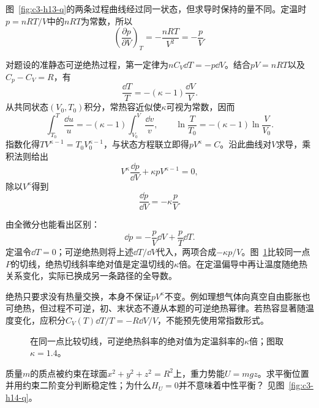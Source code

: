 \begin{solution}
图~\ref{fig:c3-h13-q}的两条过程曲线经过同一状态，但求导时保持的量不同。定温时$p=nRT/V$中的$nRT$为常数，所以
\[\boxed{\left(\frac{\partial p}{\partial V}\right)_T=-\frac{nRT}{V^2}=-\frac pV}.\]

对题设的准静态可逆绝热过程，第一定律为$nC_V\dd T=-p\dd V$。结合$pV=nRT$以及$C_p-C_V=R$，有
\[\frac{\dd T}{T}=-(\kappa-1)\frac{\dd V}{V}.
\]
从共同状态$(V_0,T_0)$积分，常热容近似使$\kappa$可视为常数，因而
\[
\int_{T_0}^{T}\frac{\dd u}{u}
=-(\kappa-1)\int_{V_0}^{V}\frac{\dd v}{v},\qquad
\ln\frac{T}{T_0}=-(\kappa-1)\ln\frac{V}{V_0}.
\]
指数化得$TV^{\kappa-1}=T_0V_0^{\kappa-1}$，与状态方程联立即得$pV^\kappa=C$。沿此曲线对$V$求导，乘积法则给出
\[V^\kappa\frac{\dd p}{\dd V}+\kappa pV^{\kappa-1}=0,\]
除以$V^\kappa$得到
\[\boxed{\frac{\dd p}{\dd V}=-\kappa\frac pV}.\]

由全微分也能看出区别：
\[\dd p=-\frac pV\dd V+\frac pT\dd T.\]
定温令$\dd T=0$；可逆绝热则将上述$\dd T/\dd V$代入，两项合成$-\kappa p/V$。图~\ref{fig:c3-h13-s}比较同一点$P$的切线，绝热切线斜率绝对值是定温切线的$\kappa$倍。在定温偏导中再让温度随绝热关系变化，实际已换成另一条路径的全导数。

绝热只要求没有热量交换，本身不保证$pV^\kappa$不变。例如理想气体向真空自由膨胀也可绝热，但过程不可逆，初、末状态不遵从本题的可逆绝热幂律。若热容显著随温度变化，应积分$C_V(T)\dd T/T=-R\dd V/V$，不能预先使用常指数形式。

\begin{figure}[H]\centering
{}
\caption{在同一点比较切线，可逆绝热斜率的绝对值为定温斜率的$\kappa$倍；图取$\kappa=1.4$。}\label{fig:c3-h13-s}
\end{figure}
\end{solution}

\begin{exercise}[球面上线性势的二阶判别]\label{ex:c3-h14}
质量$m$的质点被约束在球面$x^2+y^2+z^2=R^2$上，重力势能$U=mgz$。求平衡位置并用约束二阶变分判断稳定性；为什么$H_U=0$并不意味着中性平衡？ 见图~\ref{fig:c3-h14-q}。
\end{exercise}

